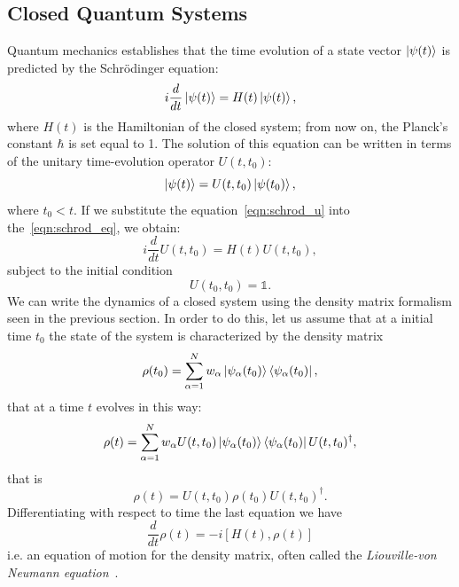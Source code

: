 \subsection{Closed Quantum Systems}
\label{closed_systems}
Quantum mechanics establishes that the time evolution of a state vector $\ket{\psi(t)}$ is predicted by the Schrödinger equation:
\begin{equation}
\label{eqn:schrod_eq}
    i\frac{d}{dt}\ket{\psi(t)} = H(t)\ket{\psi(t)},
\end{equation}
where $H(t)$ is the Hamiltonian of the closed system; from now on, the Planck's constant $\hbar$ is set equal to 1.
The solution of this equation can be written in terms of the unitary time-evolution operator $U(t, t_0)$:
\begin{equation}
\label{eqn:schrod_u}
    \ket{\psi(t)} = U(t, t_0)\ket{\psi(t_0)},
\end{equation}
where $t_0 < t$. If we substitute the equation~\ref{eqn:schrod_u} into the~\ref{eqn:schrod_eq}, we obtain:
\begin{equation}
    i\frac{d}{dt}U(t, t_0) = H(t)U(t, t_0),
\end{equation}
subject to the initial condition
\begin{equation}
    U(t_0, t_0) = \mathds{1}.
\end{equation}
We can write the dynamics of a closed system using the density matrix formalism seen in the previous section. In order to do this, let us assume that at a initial time $t_0$ the state of the system is characterized by the density matrix
\begin{equation*}
    \rho(t_0) = \sum_{\alpha = 1}^N w_\alpha \ket{\psi_\alpha(t_0)} \bra{\psi_\alpha(t_0)},
\end{equation*}
that at a time $t$ evolves in this way:
\begin{equation*}
    \rho(t) = \sum_{\alpha = 1}^N w_\alpha U(t,t_0)\ket{\psi_\alpha(t_0)} \bra{\psi_\alpha(t_0)}U(t,t_0)^\dagger,
\end{equation*}
that is
\begin{equation*}
     \rho(t) = U(t,t_0) \rho(t_0) U(t,t_0)^\dagger.
\end{equation*}
Differentiating with respect to time the last equation we have
\begin{equation}
\label{eqn:motion_closed_dm}
    \frac{d}{dt}\rho(t) = -i[H(t), \rho(t)]
\end{equation}
i.e. an equation of motion for the density matrix, often called the \emph{Liouville-von Neumann equation}~\cite{pet_breuer:open_quantum}.


